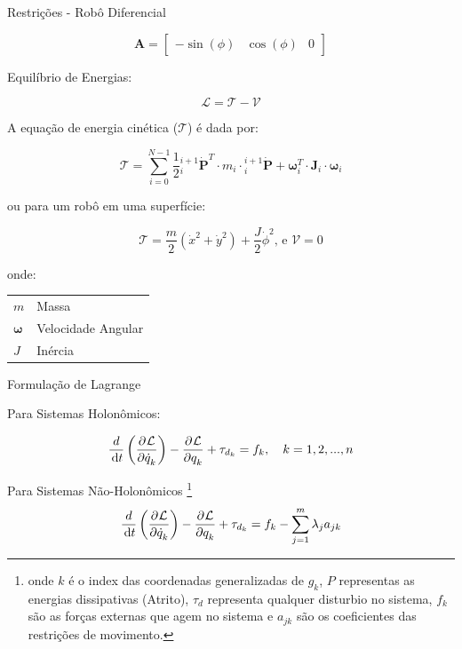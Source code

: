 Restrições - Robô Diferencial



\begin{equation}
    \mathbf{A} = 
    \begin{bmatrix}
        -\sin(\phi) & \cos(\phi) & 0
    \end{bmatrix}
\end{equation}


Equilíbrio de Energias:

\begin{equation}
    \mathcal{L}= \mathcal{T} - \mathcal{V}
\end{equation}

A equação de energia cinética ($\mathcal{T}$) é dada por:

\begin{equation}
    \mathcal{T} = \sum\limits_{i=0}^{N-1} \frac{1}{2} {}_{i}^{i+1}\dot{\mathbf{P}}^T\cdot m_{i}\cdot {}_{i}^{i+1}\dot{\mathbf{P}}+ \mathbf{\omega}_i^T\cdot \mathbf{J}_i \cdot \mathbf{\omega}_i
\end{equation}

ou para um robô em uma superfície:

\begin{equation*}
    \boxed{
        \mathcal{T} = \frac{m}{2}\left(\dot{x}^2+\dot{y}^2 \right)+ \frac{J}{2}\dot{\phi}^2}
    \text{, e  }
    \boxed{\mathcal{V} = 0}
\end{equation*}
               
    onde:
    \begin{tabular}{l|l}
        $m$               & Massa              \\
        $\mathbf{\omega}$ & Velocidade Angular \\
        $J$               & Inércia            \\
    \end{tabular}
              

Formulação de Lagrange

Para Sistemas Holonômicos:

\begin{equation}
    \frac{d}{\,\mathrm{d}t}\left( \dfrac{\partial^{}\mathcal{L}}{\partial \dot{q}_k^{}}\right)
    -\dfrac{\partial^{}\mathcal{L}}{\partial q_k^{}}
    +\tau_{d_k}
    = f_k, \quad k = 1,2,...,n
\end{equation}

Para Sistemas Não-Holonômicos \footnote{onde $k$ é o index das coordenadas generalizadas de $g_k$, $P$ representas as energias dissipativas (Atrito),
$\tau_d$ representa qualquer disturbio no sistema, $f_k$ são as forças externas que agem no sistema e $a_{jk}$ são os coeficientes das restrições de movimento.}
\begin{equation}
    \frac{d}{\,\mathrm{d}t}\left( \dfrac{\partial^{}\mathcal{L}}{\partial \dot{q}_k^{}}\right)
    -\dfrac{\partial^{}\mathcal{L}}{\partial q_k^{}}
    +\tau_{d_k}
    = f_k - \sum\limits^{m}_{j=1}\lambda_j a_{jk}
\end{equation}

